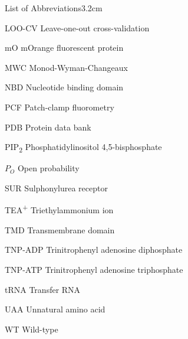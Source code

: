 \begin{mclistof}{List of Abbreviations}{3.2cm}
\item[LOO-CV] Leave-one-out cross-validation

\item[mO] mOrange fluorescent protein

\item[MWC] Monod-Wyman-Changeaux

\item[NBD] Nucleotide binding domain

\item[PCF] Patch-clamp fluorometry

\item[PDB] Protein data bank

\item[PIP\textsubscript{2}] Phosphatidylinositol 4,5-bisphosphate

\item[$P_O$] Open probability

\item[SUR] Sulphonylurea receptor

\item[TEA\textsuperscript{+}] Triethylammonium ion

\item[TMD] Transmembrane domain

\item[TNP-ADP] Trinitrophenyl adenosine diphosphate

\item[TNP-ATP] Trinitrophenyl adenosine triphosphate

\item[tRNA] Transfer RNA

\item[UAA] Unnatural amino acid

\item[WT] Wild-type

\end{mclistof}

